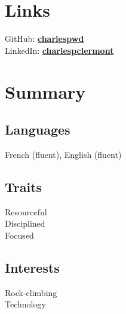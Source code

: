 \documentclass[letterpaper]{deedy-resume} %
\begin{document}
\begin{minipage}[t]{0.33\textwidth}
\section{Links}

GitHub: \href{https://GitHub.com/charlespwd}{\bf charlespwd} \\
LinkedIn: \href{http://ca.linkedin.com/in/charlespclermont}{\bf charlespclermont} \\

\sectionspace %


\section{Summary}



\subsection{Languages}
French (fluent), English (fluent)

\sectionspace
\subsection{Traits}
  \textbullet{} Resourceful \\
  \textbullet{} Disciplined \\
  \textbullet{} Focused \\

\sectionspace
\subsection{Interests}
  \textbullet{} Rock-climbing \\
  \textbullet{} Technology

\sectionspace


\end{minipage}
\end{document}

